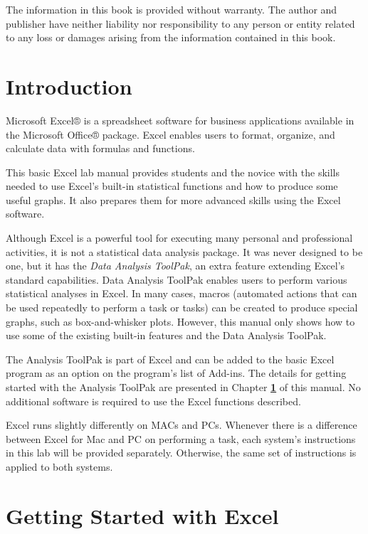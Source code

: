 \documentclass[
  12pt,
  letterpaper,
]{book}
\begin{document}
The information in this book is provided without warranty. The author and publisher have neither liability nor responsibility to any person or entity related to any loss or damages arising from the information contained in this book.

\hypertarget{introduction}{%
\chapter*{Introduction}\label{introduction}}

Microsoft Excel® is a spreadsheet software for business applications available in the Microsoft Office® package. Excel enables users to format, organize, and calculate data with formulas and functions.

This basic Excel lab manual provides students and the novice with the skills needed to use Excel's built-in statistical functions and how to produce some useful graphs. It also prepares them for more advanced skills using the Excel software.

Although Excel is a powerful tool for executing many personal and professional activities, it is not a statistical data analysis package. It was never designed to be one, but it has the \emph{Data Analysis ToolPak}, an extra feature extending Excel's standard capabilities. Data Analysis ToolPak enables users to perform various statistical analyses in Excel. In many cases, macros (automated actions that can be used repeatedly to perform a task or tasks) can be created to produce special graphs, such as box-and-whisker plots.
However, this manual only shows how to use some of the existing built-in features and the Data Analysis ToolPak.

The Analysis ToolPak is part of Excel and can be added to the basic Excel program as an option on the program's list of Add-ins. The details for getting started with the Analysis ToolPak are presented in Chapter \textbf{\ref{start}} of this manual. No additional software is required to use the Excel functions described.

Excel runs slightly differently on MACs and PCs. Whenever there is a difference between Excel for Mac and PC on performing a task, each system's instructions in this lab will be provided separately. Otherwise, the same set of instructions is applied to both systems.

\hypertarget{start}{%
\chapter{Getting Started with Excel}\label{start}}
\end{document}
